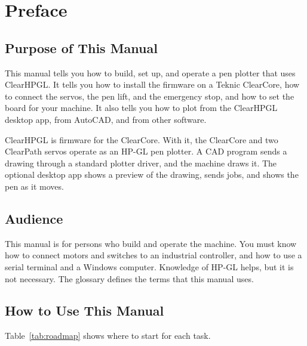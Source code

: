 \chapter{Preface}

\section*{Purpose of This Manual}

This manual tells you how to build, set up, and operate a pen plotter that
uses ClearHPGL. It tells you how to install the firmware on a Teknic
ClearCore, how to connect the servos, the pen lift, and the emergency stop,
and how to set the board for your machine. It also tells you how to plot from
the ClearHPGL desktop app, from AutoCAD, and from other software.

ClearHPGL is firmware for the ClearCore. With it, the ClearCore and two
ClearPath servos operate as an HP-GL pen plotter. A CAD program sends a
drawing through a standard plotter driver, and the machine draws it. The
optional desktop app shows a preview of the drawing, sends jobs, and shows
the pen as it moves.

\section*{Audience}

This manual is for persons who build and operate the machine. You must know
how to connect motors and switches to an industrial controller, and how to
use a serial terminal and a Windows computer. Knowledge of HP-GL helps, but
it is not necessary. The glossary defines the terms that this manual uses.

\section*{How to Use This Manual}

Table~\ref{tab:roadmap} shows where to start for each task.


